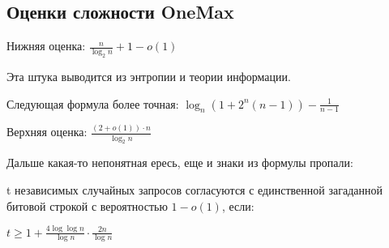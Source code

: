 
\subsection*{Оценки сложности OneMax}

Нижняя оценка: $\frac{n}{\log_2 n} + 1 - o(1)$

Эта штука выводится из энтропии и теории информации.

Следующая формула более точная:
$\log_n(1 + 2^n (n-1)) - \frac{1}{n-1}$

Верхняя оценка: $\frac{(2 + o(1)) \cdot n}{\log_2 n}$

Дальше какая-то непонятная ересь, еще и знаки из формулы пропали:

t независимых случайных запросов согласуются с единственной
загаданной битовой строкой с вероятностью $1 - o(1)$, если:

$t \geq 1 + \frac{4 \log \log n}{\log n} \cdot \frac{2n}{\log n}$
